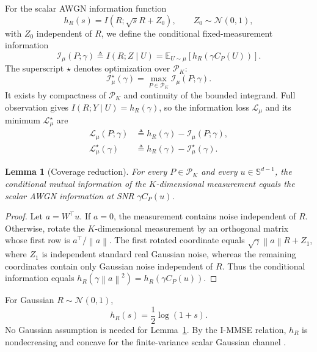 \documentclass[lettersize,onecolumn]{IEEEtran}
\newtheorem{lemma}{Lemma}
\theoremstyle{remark}
\theoremstyle{definition}
\newcommand{\EE}{\mathbb E}
\newcommand{\norm}[1]{\left\lVert #1\right\rVert}
\newcommand{\I}{\mathcal I}
\newcommand{\Lloss}{\mathcal L}
\newcommand{\Pset}{\mathcal P_K}
\begin{document}
For the scalar AWGN information function
\begin{equation}
h_R(s)=I\!\left(R;\sqrt{s}R+Z_0\right),
\qquad Z_0\sim\mathcal N(0,1),
\label{eq:h}
\end{equation}
with $Z_0$ independent of $R$, we define the conditional fixed-measurement information
\begin{equation}
\I_\mu(P;\gamma)
\triangleq I(R;Z\mid U)
=
\EE_{U\sim\mu}\left[h_R\!\left(\gamma C_P(U)\right)\right].
\label{eq:core_functional}
\end{equation}
The superscript $\star$ denotes optimization over $\Pset$:
\begin{equation}
\I_\mu^\star(\gamma)=\max_{P\in\Pset}\I_\mu(P;\gamma).
\end{equation}
It exists by compactness of $\Pset$ and continuity of the bounded integrand. Full observation gives $I(R;Y\mid U)=h_R(\gamma)$, so the information loss $\Lloss_\mu$ and its minimum $\Lloss_\mu^\star$ are
\begin{equation}
\begin{aligned}
\Lloss_\mu(P;\gamma)&\triangleq h_R(\gamma)-\I_\mu(P;\gamma),\\
\Lloss_\mu^\star(\gamma)&\triangleq h_R(\gamma)-\I_\mu^\star(\gamma).
\end{aligned}
\label{eq:loss_definition}
\end{equation}

\begin{lemma}[Coverage reduction]\label{lem:reduction}
For every $P\in\Pset$ and every $u\in\mathbb S^{d-1}$, the conditional mutual information of the $K$-dimensional measurement equals the scalar AWGN information at SNR $\gamma C_P(u)$.
\end{lemma}
\begin{proof}
Let $a=W^{\top}u$. If $a=0$, the measurement contains noise independent of $R$. Otherwise, rotate the $K$-dimensional measurement by an orthogonal matrix whose first row is $a^{\top}/\norm a$. The first rotated coordinate equals $\sqrt{\gamma}\norm a R+Z_1$, where $Z_1$ is independent standard real Gaussian noise, whereas the remaining coordinates contain only Gaussian noise independent of $R$. Thus the conditional information equals $h_R(\gamma\norm a^2)=h_R(\gamma C_P(u))$.
\end{proof}

For Gaussian $R\sim\mathcal N(0,1)$,
\begin{equation}
h_R(s)=\frac12\log(1+s).
\label{eq:gaussian_h}
\end{equation}
No Gaussian assumption is needed for Lemma~\ref{lem:reduction}. By the I-MMSE relation, $h_R$ is nondecreasing and concave for the finite-variance scalar Gaussian channel \cite{guo2005}.
\end{document}

